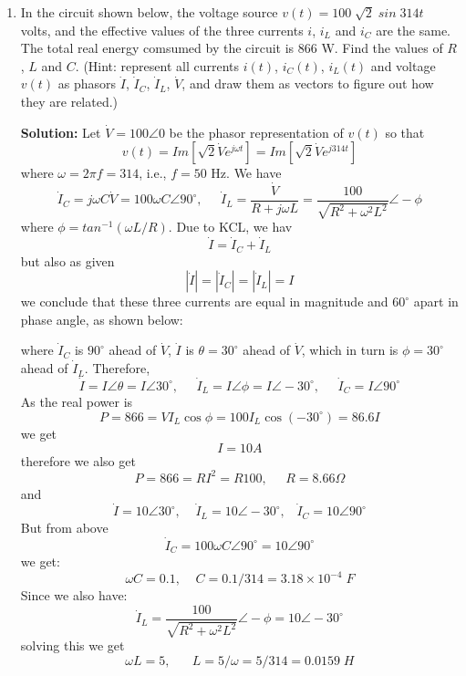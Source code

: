 \begin{enumerate}
\item 
In the circuit shown below, the voltage source $v(t)=100\;\sqrt{2}\;sin\;314t\;$ volts,
and the effective values of the three currents $i$, $i_L$ and $i_C$ are the same. The
total real energy comsumed by the circuit is 866 W. Find the values of $R$, $L$ and $C$.
(Hint: represent all currents $i(t)$, $i_C(t)$, $i_L(t)$ and voltage $v(t)$ as phasors 
$\dot{I}$, $\dot{I}_C$, $\dot{I}_L$, $\dot{V}$, and draw them as vectors to figure out
how they are related.)



{\bf Solution:}
Let $\dot{V}=100\angle 0$ be the phasor representation of $v(t)$ so that 
\[ v(t)=Im[\sqrt{2} \dot{V} e^{j\omega t}] =Im[\sqrt{2} \dot{V} e^{j314t}] \]
where $\omega=2\pi f=314$, i.e., $f=50$ Hz. We have
\[ \dot{I}_C=j\omega C \dot{V}=100\omega C \angle 90^\circ,
\;\;\;\;\;\dot{I}_L=\frac{\dot{V}}{R+j\omega L}=\frac{100}{\sqrt{R^2+\omega^2 L^2}}\angle -\phi \]
where $\phi=tan^{-1}(\omega L/R)$. Due to KCL, we hav
\[ \dot{I}=\dot{I}_C+\dot{I}_L \]
but also as given
\[ |\dot{I}|=|\dot{I}_C|=|\dot{I}_L|=I \]
we conclude that these three currents are equal in magnitude and $60^\circ$ apart in 
phase angle, as shown below:

where $\dot{I}_C$ is $90^\circ$ ahead of $\dot{V}$, $\dot{I}$ is $\theta=30^\circ$
ahead of $\dot{V}$, which in turn is $\phi=30^\circ$ ahead of $\dot{I}_L$. Therefore,
\[ \dot{I}=I\angle \theta=I\angle 30^\circ,\;\;\;\;\;\dot{I}_L=I\angle \phi=I\angle -30^\circ,
\;\;\;\;\;\dot{I}_C=I\angle 90^\circ  \]
As the real power is 
\[ P=866=V I_L \cos\phi =100 I_L \cos (-30^\circ)=86.6 I \]
we get
\[ I=10 A \]
therefore we also get
\[ P=866=RI^2=R 100,\;\;\;\;\;R=8.66 \Omega \]
and
\[ \dot{I}=10\angle 30^\circ,\;\;\;\;\dot{I}_L=10\angle -30^\circ,\;\;\;\dot{I}_C=10\angle 90^\circ  \]
But from above
\[ \dot{I}_C=100\omega C \angle 90^\circ=10\angle 90^\circ \]
we get:
\[ \omega C=0.1,\;\;\;\;C=0.1/314=3.18\times 10^{-4} \; F\]
Since we also have:
\[ \dot{I}_L=\frac{100}{\sqrt{R^2+\omega^2 L^2}}\angle -\phi=10\angle -30^\circ \]
solving this we get
\[ \omega L=5,\;\;\;\;\;\;L=5/\omega=5/314=0.0159\;H \]


\end{enumerate}
